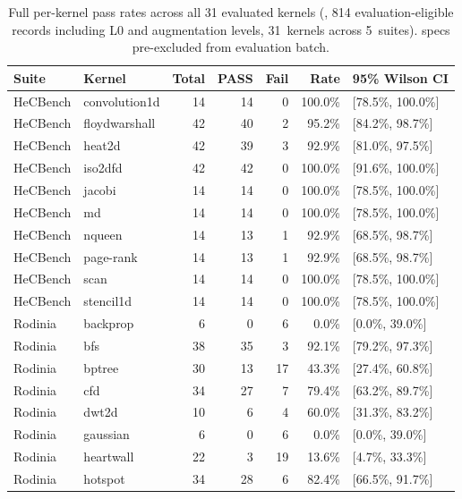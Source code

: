 \begin{table}[!htbp]
\centering
\caption{Full per-kernel pass rates across all 31 evaluated kernels (\codex{}, 814 evaluation-eligible records including L0 and augmentation levels, 31~kernels across 5~suites). \knownfail{} specs pre-excluded from evaluation batch.}
\label{tab:per-kernel-full-codex}
\footnotesize
\begin{tabular}{@{}llrrrrl@{}}
\toprule
Suite & Kernel & Total & PASS & Fail & Rate & 95\% Wilson CI \\
\midrule
HeCBench & convolution1d & 14 & 14 & 0 & 100.0\% & [78.5\%, 100.0\%] \\
HeCBench & floydwarshall & 42 & 40 & 2 & 95.2\% & [84.2\%, 98.7\%] \\
HeCBench & heat2d & 42 & 39 & 3 & 92.9\% & [81.0\%, 97.5\%] \\
HeCBench & iso2dfd & 42 & 42 & 0 & 100.0\% & [91.6\%, 100.0\%] \\
HeCBench & jacobi & 14 & 14 & 0 & 100.0\% & [78.5\%, 100.0\%] \\
HeCBench & md & 14 & 14 & 0 & 100.0\% & [78.5\%, 100.0\%] \\
HeCBench & nqueen & 14 & 13 & 1 & 92.9\% & [68.5\%, 98.7\%] \\
HeCBench & page-rank & 14 & 13 & 1 & 92.9\% & [68.5\%, 98.7\%] \\
HeCBench & scan & 14 & 14 & 0 & 100.0\% & [78.5\%, 100.0\%] \\
HeCBench & stencil1d & 14 & 14 & 0 & 100.0\% & [78.5\%, 100.0\%] \\
\midrule
Rodinia & backprop & 6 & 0 & 6 & 0.0\% & [0.0\%, 39.0\%] \\
Rodinia & bfs & 38 & 35 & 3 & 92.1\% & [79.2\%, 97.3\%] \\
Rodinia & bptree & 30 & 13 & 17 & 43.3\% & [27.4\%, 60.8\%] \\
Rodinia & cfd & 34 & 27 & 7 & 79.4\% & [63.2\%, 89.7\%] \\
Rodinia & dwt2d & 10 & 6 & 4 & 60.0\% & [31.3\%, 83.2\%] \\
Rodinia & gaussian & 6 & 0 & 6 & 0.0\% & [0.0\%, 39.0\%] \\
Rodinia & heartwall & 22 & 3 & 19 & 13.6\% & [4.7\%, 33.3\%] \\
Rodinia & hotspot & 34 & 28 & 6 & 82.4\% & [66.5\%, 91.7\%] \\

\end{tabular}
\end{table}

